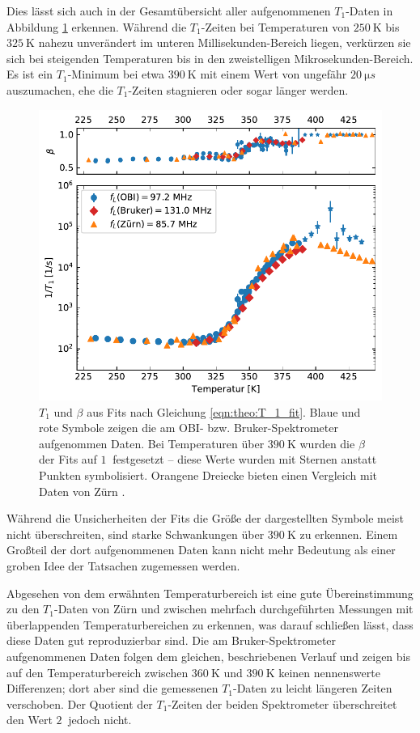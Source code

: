 Dies lässt sich auch in der Gesamtübersicht aller aufgenommenen $T_1$-Daten in Abbildung \ref{fig:res:T_1} erkennen. Während die $T_1$-Zeiten bei Temperaturen von $\SI{250}{\kelvin}$ bis $\SI{325}{\kelvin}$ nahezu unverändert im unteren Millisekunden-Bereich liegen, verkürzen sie sich bei steigenden Temperaturen bis in den zweistelligen Mikrosekunden-Bereich. Es ist ein $T_1$-Minimum bei etwa $\SI{390}{\kelvin}$ mit einem Wert von ungefähr $\SI{20}{\micro s}$ auszumachen, ehe die $T_1$-Zeiten stagnieren oder sogar länger werden.
\begin{figure}
	\begin{center}
		\includegraphics[width=.9\textwidth]{graphics/plot/t1.pdf}
	\end{center}
	\caption{$T_1$ und $\beta$ aus Fits nach Gleichung \eqref{eqn:theo:T_1_fit}. Blaue und rote Symbole zeigen die am OBI- bzw. Bruker-Spektrometer aufgenommen Daten. Bei Temperaturen über $\SI{390}{\kelvin}$ wurden die $\beta$ der Fits auf $\SI{1}{}$ festgesetzt -- diese Werte wurden mit Sternen anstatt Punkten symbolisiert. Orangene Dreiecke bieten einen Vergleich mit Daten von Zürn \cite{zuern_paper}.} \label{fig:res:T_1}
\end{figure}

Während die Unsicherheiten der Fits die Größe der dargestellten Symbole meist nicht überschreiten, sind starke Schwankungen über $\SI{390}{\kelvin}$ zu erkennen. Einem Großteil der dort aufgenommenen Daten kann nicht mehr Bedeutung als einer groben Idee der Tatsachen zugemessen werden.

Abgesehen von dem erwähnten Temperaturbereich ist eine gute Übereinstimmung zu den $T_1$-Daten von Zürn \cite{zuern_paper} und zwischen mehrfach durchgeführten Messungen mit überlappenden Temperaturbereichen zu erkennen, was darauf schließen lässt, dass diese Daten gut reproduzierbar sind. Die am Bruker-Spektrometer aufgenommenen Daten folgen dem gleichen, beschriebenen Verlauf und zeigen bis auf den Temperaturbereich zwischen $\SI{360}{\kelvin}$ und $\SI{390}{\kelvin}$ keinen nennenswerte Differenzen; dort aber sind die gemessenen $T_1$-Daten zu leicht längeren Zeiten verschoben. Der Quotient der $T_1$-Zeiten der beiden Spektrometer überschreitet den Wert $\SI{2}{}$ jedoch nicht.

